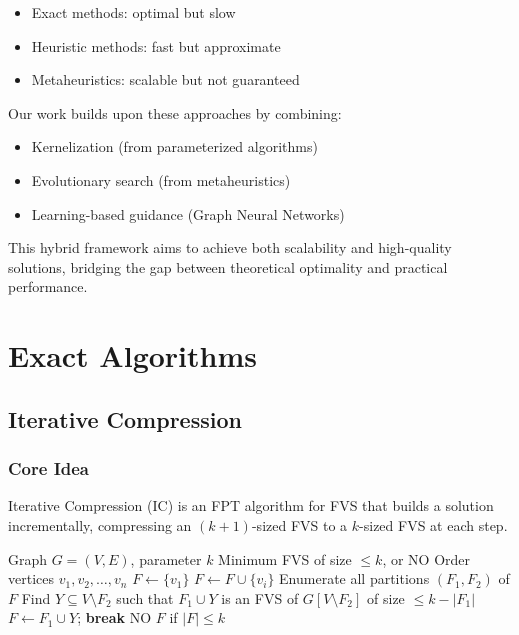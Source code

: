 \documentclass[10pt,a4paper]{report}
\theoremstyle{definition}
\newcommand{\fvs}{\textsc{FVS}}
\begin{document}
\begin{itemize}
  \item Exact methods: optimal but slow
  \item Heuristic methods: fast but approximate
  \item Metaheuristics: scalable but not guaranteed
\end{itemize}

Our work builds upon these approaches by combining:
\begin{itemize}
  \item Kernelization (from parameterized algorithms)
  \item Evolutionary search (from metaheuristics)
  \item Learning-based guidance (Graph Neural Networks)
\end{itemize}

This hybrid framework aims to achieve both scalability and high-quality solutions, bridging the gap between theoretical optimality and practical performance.



\chapter{Exact Algorithms}
\label{ch:exact}

\section{Iterative Compression}

\subsection{Core Idea}

Iterative Compression (IC) is an FPT algorithm for \fvs{} that builds a solution incrementally, compressing an $(k+1)$-sized FVS to a $k$-sized FVS at each step.

\begin{algorithm}[H]
	\caption{Iterative Compression for \fvs{}}
	\label{alg:ic}
	\begin{algorithmic}[1]
		\Require Graph $G = (V, E)$, parameter $k$
		\Ensure Minimum FVS of size $\leq k$, or NO
		\State Order vertices $v_1, v_2, \ldots, v_n$
		\State $F \leftarrow \{v_1\}$
		\State $F \leftarrow F \cup \{v_i\}$
		\State Enumerate all partitions $(F_1, F_2)$ of $F$
		\State Find $Y \subseteq V \setminus F_2$ such that $F_1 \cup Y$ is an FVS of $G[V \setminus F_2]$ of size $\leq k - |F_1|$
		\State $F \leftarrow F_1 \cup Y$; \textbf{break}
		\EndIf
		\EndFor
		\Return NO
		\EndIf
		\EndIf
		\EndFor
		\Return $F$ if $|F| \leq k$
	\end{algorithmic}
\end{algorithm}
\end{document}
